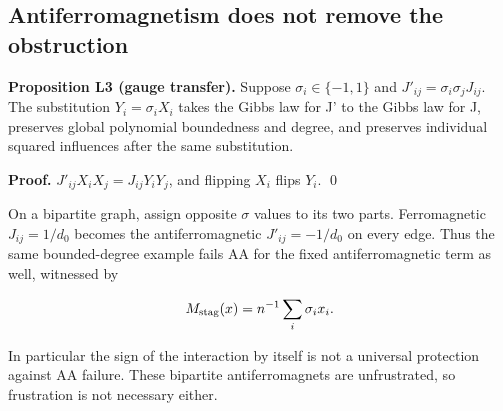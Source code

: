 \subsection{Antiferromagnetism does not remove the
obstruction}\label{proof:local_interactions:antiferromagnetism-does-not-remove-the-obstruction}

\textbf{Proposition L3 (gauge transfer).} Suppose
\(\sigma_i\in\{-1,1\}\) and \(J'_{ij}=\sigma _i\sigma _jJ_{ij}\). The
substitution \(Y_i=\sigma _iX_i\) takes the Gibbs law for J' to the
Gibbs law for J, preserves global polynomial boundedness and degree, and
preserves individual squared influences after the same substitution.

\textbf{Proof.} \(J'_{ij}X_iX_j=J_{ij}Y_iY_j\), and flipping
\(X_i\) flips \(Y_i\). \qed

On a bipartite graph, assign opposite \(\sigma\) values to its two
parts. Ferromagnetic \(J_{ij}=1/d_{0}\) becomes the antiferromagnetic
\(J'_{ij}=-1/d_{0}\) on every edge. Thus the same bounded-degree example
fails AA for the fixed antiferromagnetic term as well, witnessed by

\[
M_{\rm stag}(x)=n^{-1}\sum_i\sigma_ix_i.
\]

In particular the sign of the interaction by itself is not a universal
protection against AA failure. These bipartite antiferromagnets are
unfrustrated, so frustration is not necessary either.
